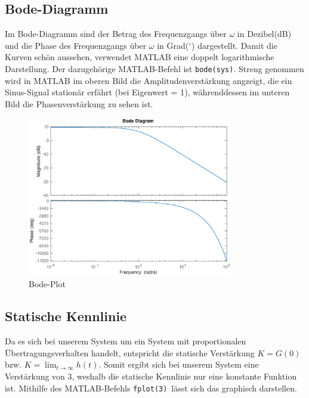 \subsection{Bode-Diagramm}
Im Bode-Diagramm sind der Betrag des Frequenzgangs über $\omega$ in Dezibel(dB) und die Phase des Frequenzgangs über $\omega$ in Grad($^\circ$) dargestellt. Damit die Kurven schön aussehen, verwendet MATLAB eine doppelt logarithmische Darstellung. Der dazugehörige MATLAB-Befehl ist \texttt{bode(sys)}. Streng genommen wird in MATLAB im oberen Bild die Amplitudenverstärkung angzeigt, die ein Sinus-Signal stationär erfährt (bei Eigenwert = 1), währenddessen im unteren Bild die Phasenverstärkung zu sehen ist.

\begin{figure}[H]
    \label{fig:bode}
    \centering
    \includegraphics[width=0.8\textwidth]{Bilder/BodePT1Tt.eps}
    \caption{Bode-Plot}
 \end{figure}

\subsection{Statische Kennlinie}
Da es sich bei unserem System um ein System mit proportionalen Übertragungsverhalten handelt, entspricht die statische Verstärkung $K = G(0)$ bzw. $K = \lim_{t\to \infty} h(t)$. Somit ergibt sich bei unserem System eine Verstärkung von 3, weshalb die statische Kennlinie nur eine konstante Funktion ist. Mithilfe des MATLAB-Befehls \texttt{fplot(3)} lässt sich das graphisch darstellen. 


